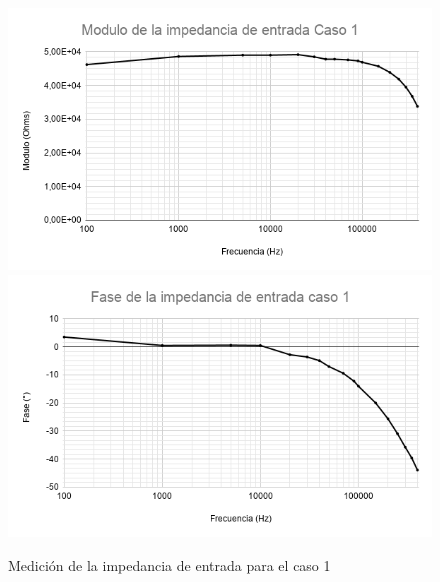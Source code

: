 \begin{figure}[H]
\begin{centering}
\includegraphics[scale=0.4]{../Ex1/iB/Resources1b/zinp1_m_med}\includegraphics[scale=0.4]{../Ex1/iB/Resources1b/zinp1_p_med}
\par\end{centering}
\caption{Medición de la impedancia de entrada para el caso 1}

\end{figure}

